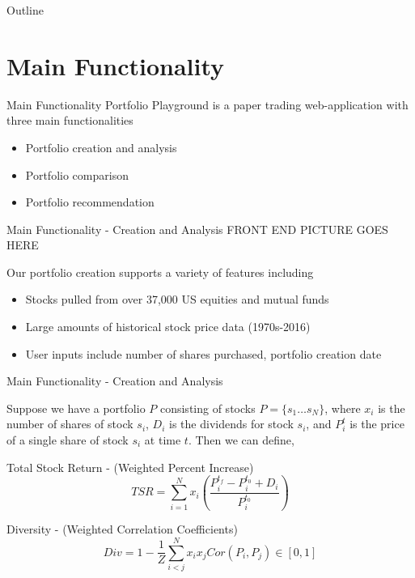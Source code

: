 \documentclass{beamer}
\begin{document}
\begin{frame}{Outline}
  \tableofcontents
\end{frame}

\section{Main Functionality}

\begin{frame}{Main Functionality}
Portfolio Playground is a paper trading web-application with three main functionalities \\

	\begin{itemize}
		\item Portfolio creation and analysis
		\item Portfolio comparison
		\item Portfolio recommendation
	\end{itemize}

\end{frame}

\begin{frame}{Main Functionality - Creation and Analysis}
FRONT END PICTURE GOES HERE

Our portfolio creation supports a variety of features including
	\begin{itemize}
		\item Stocks pulled from over 37,000 US equities and mutual funds
		\item Large amounts of historical stock price data (1970s-2016)
		\item User inputs include number of shares purchased, portfolio creation date
	\end{itemize}
\end{frame}

\begin{frame}{Main Functionality - Creation and Analysis}

Suppose we have a portfolio $P$ consisting of stocks $P = \{s_1\dots s_N\}$, where $x_i$ is the number of shares of stock $s_i$, $D_i$ is the dividends for stock $s_i$, and $P^{t}_{i}$ is the price of a single share of stock $s_i$ at time $t$. Then we can define,

\begin{block}{Total Stock Return - (Weighted Percent Increase)}
$$TSR = \sum_{i=1}^N x_i \left( \frac{P^{t_f}_{i} - P^{t_0}_{i} + D_i}{P^{t_0}_{i}} \right) $$
\end{block}

\begin{block}{Diversity - (Weighted Correlation Coefficients)}
$$Div = 1 - \frac{1}{Z} \sum_{i<j}^N x_i x_j Cor(P_i,P_j) \in \left[ 0,1 \right]$$ 
\end{block}

\end{frame}
\end{document}

